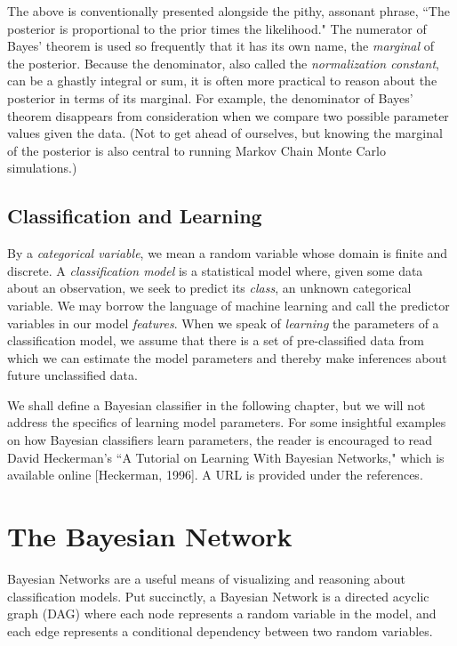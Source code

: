 \documentclass[12pt,twoside]{reedthesis}
\begin{document}
The above is conventionally presented alongside the pithy, assonant phrase, ``The posterior is proportional to the prior times the likelihood." The numerator of Bayes' theorem is used so frequently that it has its own name, the {\em marginal} of the posterior. Because the denominator, also called the {\em normalization constant}, can be a ghastly integral or sum, it is often more practical to reason about the posterior in terms of its marginal. For example, the denominator of Bayes' theorem disappears from consideration when we compare two possible parameter values given the data. (Not to get ahead of ourselves, but knowing the marginal of the posterior is also central to running Markov Chain Monte Carlo simulations.)

\section{Classification and Learning}
By a {\em categorical variable}, we mean a random variable whose domain is finite and discrete.
A {\em classification model} is a statistical model where, given some data about an observation, we seek to predict its {\em class}, an unknown categorical variable. We may borrow the language of machine learning and call the predictor variables in our model {\em features}. When we speak of {\em learning} the parameters of a classification model, we assume that there is a set of pre-classified data from which we can estimate the model parameters and thereby make inferences about future unclassified data. 

We shall define a Bayesian classifier in the following chapter, but we will not address the specifics of learning model parameters. For some insightful examples on how Bayesian classifiers learn parameters, the reader is encouraged to read David Heckerman's ``A Tutorial on Learning With Bayesian Networks," which is available online [Heckerman, 1996]. A URL is provided under the references. 

    \chapter{The Bayesian Network}

    	Bayesian Networks are a useful means of visualizing and reasoning about classification models. Put succinctly, a Bayesian Network is a directed acyclic graph (DAG) where each node represents a random variable in the model, and each edge represents a conditional dependency between two random variables.
\end{document}
